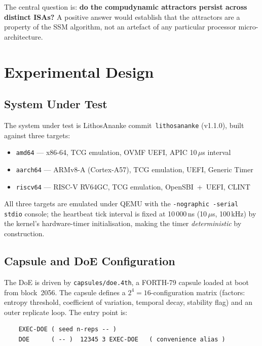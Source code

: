 \documentclass[10pt,a4paper]{article}
\begin{document}
The central question is: \textbf{do the compudynamic attractors persist across
distinct ISAs?}  A positive answer would establish that the attractors are a
property of the SSM algorithm, not an artefact of any particular processor
micro-architecture.

\section{Experimental Design}
\label{sec:design}

\subsection{System Under Test}

The system under test is LithosAnanke commit~\texttt{lithosananke} (v1.1.0),
built against three targets:
\begin{itemize}[noitemsep]
  \item \texttt{amd64} — x86-64, TCG emulation, OVMF UEFI, APIC 10\,\(\mu\)s interval
  \item \texttt{aarch64} — ARMv8-A (Cortex-A57), TCG emulation, UEFI, Generic Timer
  \item \texttt{riscv64} — RISC-V RV64GC, TCG emulation, OpenSBI~+~UEFI, CLINT
\end{itemize}

All three targets are emulated under QEMU with the \texttt{-nographic -serial stdio}
console; the heartbeat tick interval is fixed at 10\,000\,ns (10\,\(\mu\)s,
100\,kHz) by the kernel's hardware-timer initialisation, making the timer
\emph{deterministic} by construction.

\subsection{Capsule and DoE Configuration}

The DoE is driven by \texttt{capsules/doe.4th}, a FORTH-79 capsule loaded at
boot from block~2056.  The capsule defines a \(2^4 = 16\)-configuration
matrix (factors: entropy threshold, coefficient of variation, temporal decay,
stability flag) and an outer replicate loop.  The entry point is:

\begin{verbatim}
    EXEC-DOE ( seed n-reps -- )
    DOE      ( -- )  12345 3 EXEC-DOE   ( convenience alias )
\end{verbatim}
\end{document}
